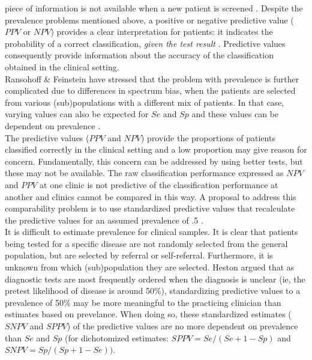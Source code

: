 \documentclass[
  nojss]{jss}
\begin{document}
piece of information is not available when a new patient is screened
\citep{gallagher_problem_2003}. Despite the prevalence problems
mentioned above, a positive or negative predictive value (\(PPV\) or
\(NPV\)) provides a clear interpretation for patients: it indicates the
probability of a correct classification, \emph{given the test result}
\citep{gallagher_problem_2003}. Predictive values consequently provide
information about the accuracy of the classification obtained in the
clinical setting.\\
Ransohoff \& Feinstein \citeyearpar{ransohoff_problems_1978} have
stressed that the problem with prevalence is further complicated due to
differences in spectrum bias, when the patients are selected from
various (sub)populations with a different mix of patients. In that case,
varying values can also be expected for \(Se\) and \(Sp\) and these
values can be dependent on prevalence
\citep{brenner_variation_1997, usher-smith_spectrum_2016}.\\
The predictive values (\(PPV\) and \(NPV\)) provide the proportions of
patients classified correctly in the clinical setting and a low
proportion may give reason for concern. Fundamentally, this concern can
be addressed by using better tests, but these may not be available. The
raw classification performance expressed as \(NPV\) and \(PPV\) at one
clinic is not predictive of the classification performance at another
and clinics cannot be compared in this way. A proposal to address this
comparability problem is to use standardized predictive values that
recalculate the predictive values for an assumed prevalence of .5
\citep{heston_standardizing_2011, heston_standardized_2014}.\\
It is difficult to estimate prevalence for clinical samples. It is clear
that patients being tested for a specific disease are not randomly
selected from the general population, but are selected by referral or
self-referral. Furthermore, it is unknown from which (sub)population
they are selected. Heston \citeyearpar{heston_standardized_2014} argued
that as diagnostic tests are most frequently ordered when the diagnosis
is unclear (ie, the pretest likelihood of disease is around 50\%),
standardizing predictive values to a prevalence of 50\% may be more
meaningful to the practicing clinician than estimates based on
prevelance. When doing so, these standardized estimates (\(SNPV\) and
\(SPPV\)) of the predictive values are no more dependent on prevalence
than \(Se\) and \(Sp\) (for dichotomized estimates:
\(SPPV = Se / (Se + 1 - Sp)\) and \(SNPV = Sp / (Sp + 1 - Se))\).\\
\end{document}
